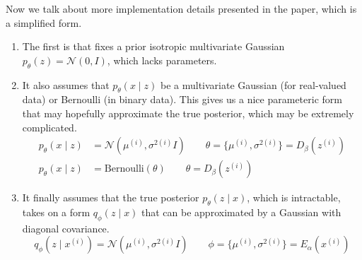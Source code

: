   Now we talk about more implementation details presented in the paper, which is a simplified form. 
  \begin{enumerate}
    \item The first is that \cite{vae} fixes a prior isotropic multivariate Gaussian $p_\theta (z) = \mathcal{N}(0, I)$, which lacks parameters. 

    \item It also assumes that $p_\theta (x \mid z)$ be a multivariate Gaussian (for real-valued data) or Bernoulli (in binary data). This gives us a nice parameteric form that may hopefully approximate the true posterior, which may be extremely complicated. 
    \begin{align}
      p_\theta (x \mid z) & = \mathcal{N}(\mu^{(i)}, \sigma^{2(i)} I) \qquad \theta = \{\mu^{(i)}, \sigma^{2 (i)} \} = D_\beta (z^{(i)}) \\
      p_\theta (x \mid z) & = \mathrm{Bernoulli}(\theta) \qquad \theta = D_\beta (z^{(i)}) 
    \end{align}

    \item It finally assumes that the true posterior $p_\theta (z \mid x)$, which is intractable, takes on a form $q_\phi (z \mid x)$ that can be approximated by a Gaussian with diagonal covariance. 
    \begin{equation}
      q_\phi (z \mid x^{(i)}) = \mathcal{N}(\mu^{(i)}, \sigma^{2 (i)} I) \qquad \phi = \{\mu^{(i)}, \sigma^{2 (i)} \} = E_\alpha (x^{(i)})
    \end{equation}
  \end{enumerate} 

